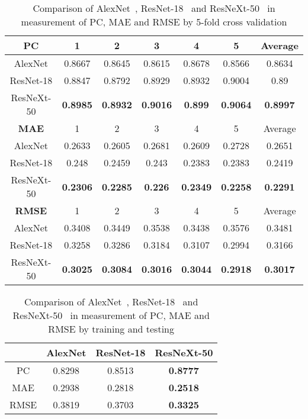 \documentclass[10pt,conference,a4paper]{IEEEtran}
\begin{document}
\begin{table}[t]
\caption{Comparison of AlexNet~\cite{krizhevsky2012imagenet}, ResNet-18~\cite{he2016deep} and ResNeXt-50~\cite{xie2016aggregated} in measurement of PC, MAE and RMSE by 5-fold cross validation}
\label{table_deep1}
\centering
\begin{tabular}{c|c|c|c|c|c|c}
\hline
\hline
\textbf{PC} & 1 & 2 & 3 & 4 & 5 & Average \\
\hline
AlexNet  & 0.8667 & 0.8645 & 0.8615 & 0.8678 & 0.8566 & 0.8634 \\
ResNet-18 & 0.8847 & 0.8792 & 0.8929 & 0.8932 & 0.9004 & 0.89 \\
ResNeXt-50 & \textbf{0.8985} & \textbf{0.8932} & \textbf{0.9016} & \textbf{0.899} & \textbf{0.9064} & \textbf{0.8997} \\
\hline
\hline
\textbf{MAE} & 1 & 2 & 3 & 4 & 5 & Average \\
\hline
AlexNet & 0.2633 & 0.2605 & 0.2681 & 0.2609 & 0.2728 & 0.2651 \\
ResNet-18 & 0.248 & 0.2459 & 0.243 & 0.2383 & 0.2383 & 0.2419 \\
ResNeXt-50 & \textbf{0.2306} & \textbf{0.2285} & \textbf{0.226} & \textbf{0.2349} & \textbf{0.2258} & \textbf{0.2291} \\
\hline
\hline
\textbf{RMSE} & 1 & 2 & 3 & 4 & 5 & Average \\
\hline
AlexNet & 0.3408 & 0.3449 & 0.3538 & 0.3438 & 0.3576 & 0.3481 \\
ResNet-18 & 0.3258 & 0.3286 & 0.3184 & 0.3107 & 0.2994 & 0.3166 \\
ResNeXt-50 & \textbf{0.3025} & \textbf{0.3084} & \textbf{0.3016} & \textbf{0.3044} & \textbf{0.2918} & \textbf{0.3017} \\
\hline
\end{tabular}
\end{table}

\begin{table}[!ht]
\centering
\caption{Comparison of AlexNet~\cite{krizhevsky2012imagenet}, ResNet-18~\cite{he2016deep} and ResNeXt-50~\cite{xie2016aggregated} in measurement of PC, MAE and RMSE by  training and  testing}
\label{table_deep2}
\begin{tabular}{cccc}
\toprule
 & AlexNet & ResNet-18 & ResNeXt-50 \\
\midrule
PC & 0.8298 &	0.8513	& \textbf{0.8777} \\
MAE & 0.2938 &	0.2818	& \textbf{0.2518}\\
RMSE & 0.3819 &	0.3703	& \textbf{0.3325} \\
\bottomrule
\end{tabular}
\end{table}
\end{document}
